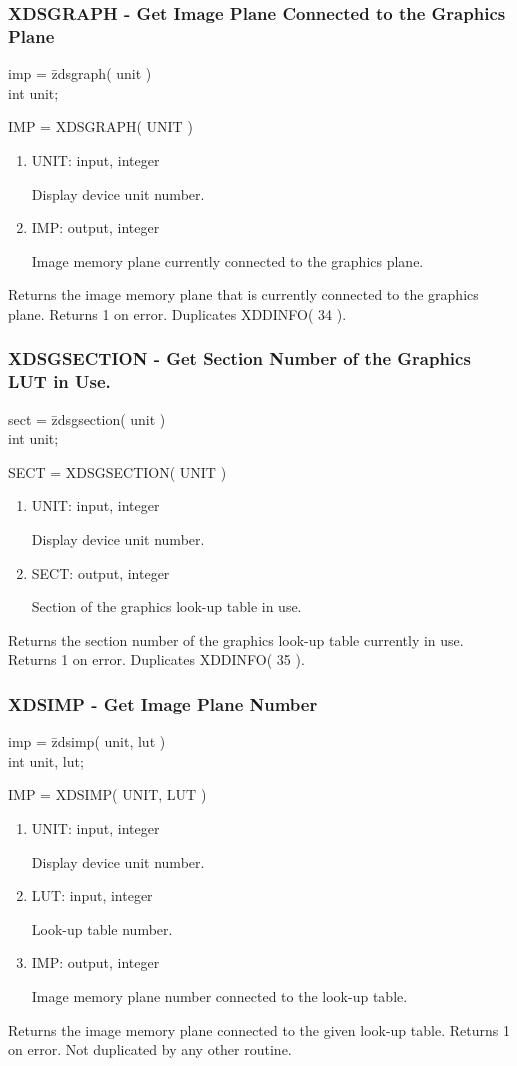 \subsubsection{XDSGRAPH - Get Image Plane Connected to the Graphics Plane}
\begin{tabbing}
imp = \=zdsgraph( unit )\\
\>int  unit;\\
\end{tabbing}
IMP = XDSGRAPH( UNIT )
\begin{enumerate}
\item UNIT:  input, integer

Display device unit number.
\item IMP:  output, integer

Image memory plane currently connected to the graphics plane.
\end{enumerate}
Returns the image memory plane that is currently connected to the graphics
plane.  Returns 1 on error.  Duplicates XDDINFO( 34 ).
\newpage
\subsubsection{XDSGSECTION - Get Section Number of the Graphics LUT in Use.}
\begin{tabbing}
sect = \=zdsgsection( unit )\\
\>int  unit;\\
\end{tabbing}
SECT = XDSGSECTION( UNIT )
\begin{enumerate}
\item UNIT:  input, integer

Display device unit number.
\item SECT:  output, integer

Section of the graphics look-up table in use.
\end{enumerate}
Returns the section number of the graphics look-up table currently in use.
Returns 1 on error.  Duplicates XDDINFO( 35 ).
\newpage
\subsubsection{XDSIMP - Get Image Plane Number}
\begin{tabbing}
imp = \=zdsimp( unit, lut )\\
\>int  unit, lut;\\
\end{tabbing}
IMP = XDSIMP( UNIT, LUT )
\begin{enumerate}
\item UNIT:  input, integer

Display device unit number.
\item LUT:  input, integer

Look-up table number.
\item IMP:  output, integer

Image memory plane number connected to the look-up table.
\end{enumerate}
Returns the image memory plane connected to the given look-up table.
Returns 1 on error.  Not duplicated by any other routine.
\newpage
